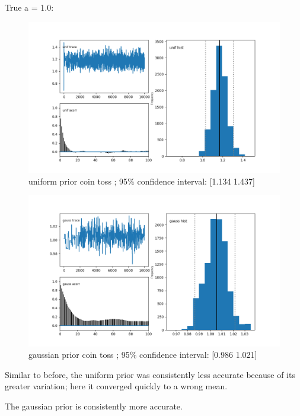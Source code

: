 \documentclass[a4paper,11pt,english]{article}
\begin{document}
\par True a = 1.0:
\begin{figure}[H]
	
	\includegraphics[width=\linewidth]{lighthouse/a_unif}
	uniform prior coin toss ;   95$\%$ confidence interval: [1.134 1.437]
	
		
	\includegraphics[width=\linewidth]{lighthouse/a_gauss}
	gaussian prior coin toss ;  95$\%$ confidence interval: 
[0.986 1.021]

\end{figure}

\par Similar to before, the uniform prior was consistently less accurate because of its greater variation; here it converged quickly to a wrong mean.
\par The gaussian prior is consistently more accurate.
\end{document}
